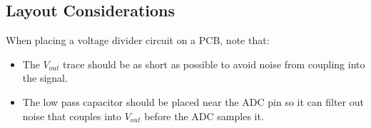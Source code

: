 \documentclass[main.tex]{subfiles}
\begin{document}

\subsection{Layout Considerations}
When placing a voltage divider circuit on a PCB, note that:
\begin{itemize}
    \item The $V_{out}$ trace should be as short as possible to avoid noise from coupling into the signal. 
    \item The low pass capacitor should be placed near the ADC pin so it can filter out noise that couples into $V_{out}$ before the ADC samples it.
\end{itemize}
\end{document}
